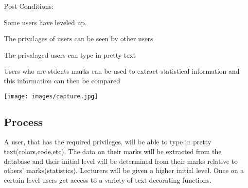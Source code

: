 \documentclass[a4paper,12pt]{article}
\begin{document}
Post-Conditions:
\begin{list_type}

\item Some users have leveled up.
\item The privalages of users can be seen by other users
\item The privalaged users can type in pretty text
\item Users who are stdents marks can be used to extract statistical information and this information can then be compared
\end{list_type}
      \centering
\texttt{[image: images/capture.jpg]}


\subsection{Process}
A user, that has the required privileges, will be able to type in pretty text(colors,code,etc). The data on their marks will be extracted from the database and their initial level will be determined from their marks relative to others' marks(statistics). Lecturers will be given a higher initial level. Once on a certain level users get access to a variety of text decorating functions.
 
 
\end{document}
